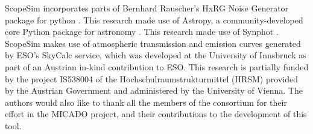 
ScopeSim incorporates parts of Bernhard Rauscher's HxRG Noise Generator package for python \citep{nghxrg}.
This research made use of Astropy, a community-developed core Python package for astronomy \citep{astropy, astropy2}.
This research made use of Synphot \citep{synphot}.
ScopeSim makes use of atmospheric transmission and emission curves generated by ESO's SkyCalc service, which was developed at the University of Innsbruck as part of an Austrian in-kind contribution to ESO.
This research is partially funded by the project IS538004 of the Hochschulraumstrukturmittel (HRSM) provided by the Austrian Government and administered by the University of Vienna.
The authors would also like to thank all the members of the consortium for their effort in the MICADO project, and their contributions to the development of this tool.
